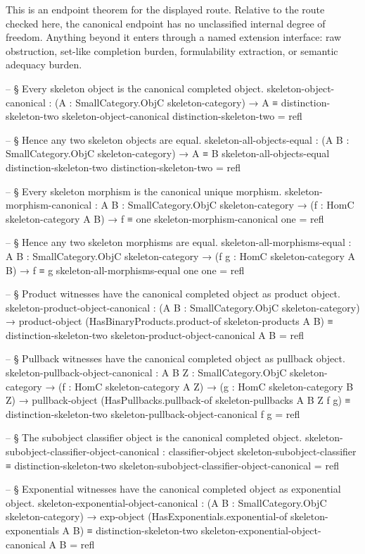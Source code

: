 \documentclass[11pt]{article}
\begin{document}
This is an endpoint theorem for the displayed route.  Relative to the
route checked here, the canonical endpoint has no unclassified internal
degree of freedom.  Anything beyond it enters through a named extension
interface: raw obstruction, set-like completion burden, formulability
extraction, or semantic adequacy burden.

\begin{code}
-- § Every skeleton object is the canonical completed object.
skeleton-object-canonical :
  (A : SmallCategory.ObjC skeleton-category) → A ≡ distinction-skeleton-two
skeleton-object-canonical distinction-skeleton-two = refl

-- § Hence any two skeleton objects are equal.
skeleton-all-objects-equal :
  (A B : SmallCategory.ObjC skeleton-category) → A ≡ B
skeleton-all-objects-equal distinction-skeleton-two distinction-skeleton-two = refl

-- § Every skeleton morphism is the canonical unique morphism.
skeleton-morphism-canonical :
  {A B : SmallCategory.ObjC skeleton-category} →
  (f : HomC skeleton-category A B) → f ≡ one
skeleton-morphism-canonical one = refl

-- § Hence any two skeleton morphisms are equal.
skeleton-all-morphisms-equal :
  {A B : SmallCategory.ObjC skeleton-category} →
  (f g : HomC skeleton-category A B) → f ≡ g
skeleton-all-morphisms-equal one one = refl

-- § Product witnesses have the canonical completed object as product object.
skeleton-product-object-canonical :
  (A B : SmallCategory.ObjC skeleton-category) →
  product-object (HasBinaryProducts.product-of skeleton-products A B) ≡
  distinction-skeleton-two
skeleton-product-object-canonical A B = refl

-- § Pullback witnesses have the canonical completed object as pullback object.
skeleton-pullback-object-canonical :
  {A B Z : SmallCategory.ObjC skeleton-category} →
  (f : HomC skeleton-category A Z) →
  (g : HomC skeleton-category B Z) →
  pullback-object (HasPullbacks.pullback-of skeleton-pullbacks {A} {B} {Z} f g) ≡
  distinction-skeleton-two
skeleton-pullback-object-canonical f g = refl

-- § The subobject classifier object is the canonical completed object.
skeleton-subobject-classifier-object-canonical :
  classifier-object skeleton-subobject-classifier ≡ distinction-skeleton-two
skeleton-subobject-classifier-object-canonical = refl

-- § Exponential witnesses have the canonical completed object as exponential object.
skeleton-exponential-object-canonical :
  (A B : SmallCategory.ObjC skeleton-category) →
  exp-object (HasExponentials.exponential-of skeleton-exponentials A B) ≡
  distinction-skeleton-two
skeleton-exponential-object-canonical A B = refl


\end{code}
\end{document}
